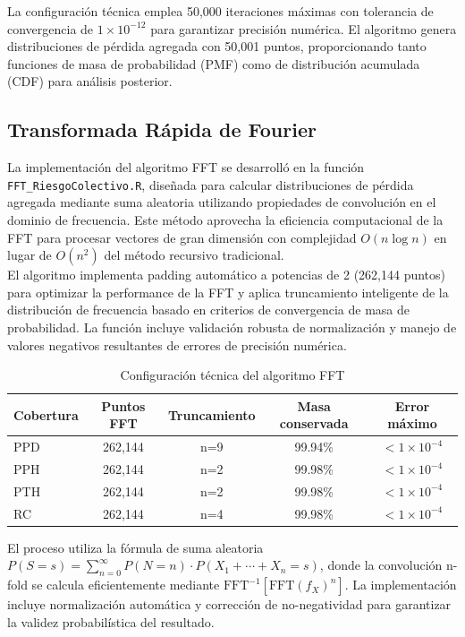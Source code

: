 La configuración técnica emplea 50,000 iteraciones máximas con tolerancia de convergencia de $1 \times 10^{-12}$ para garantizar precisión numérica. El algoritmo genera distribuciones de pérdida agregada con 50,001 puntos, proporcionando tanto funciones de masa de probabilidad (PMF) como de distribución acumulada (CDF) para análisis posterior.

\subsection{Transformada Rápida de Fourier}

La implementación del algoritmo FFT se desarrolló en la función \texttt{FFT\_RiesgoColectivo.R}, diseñada para calcular distribuciones de pérdida agregada mediante suma aleatoria utilizando propiedades de convolución en el dominio de frecuencia. Este método aprovecha la eficiencia computacional de la FFT para procesar vectores de gran dimensión con complejidad $O(n \log n)$ en lugar de $O(n^2)$ del método recursivo tradicional.\\

El algoritmo implementa padding automático a potencias de 2 (262,144 puntos) para optimizar la performance de la FFT y aplica truncamiento inteligente de la distribución de frecuencia basado en criterios de convergencia de masa de probabilidad. La función incluye validación robusta de normalización y manejo de valores negativos resultantes de errores de precisión numérica.

\begin{table}[H]
\centering
\caption{Configuración técnica del algoritmo FFT}
\begin{tabular}{lcccc}
\hline
\textbf{Cobertura} & \textbf{Puntos FFT} & \textbf{Truncamiento} & \textbf{Masa conservada} & \textbf{Error máximo} \\
\hline
PPD & 262,144 & n=9 & 99.94\% & $<1 \times 10^{-4}$ \\
PPH & 262,144 & n=2 & 99.98\% & $<1 \times 10^{-4}$ \\
PTH & 262,144 & n=2 & 99.98\% & $<1 \times 10^{-4}$ \\
RC & 262,144 & n=4 & 99.98\% & $<1 \times 10^{-4}$ \\
\hline
\end{tabular}
\end{table}

El proceso utiliza la fórmula de suma aleatoria $P(S = s) = \sum_{n=0}^{\infty} P(N = n) \cdot P(X_1 + \cdots + X_n = s)$, donde la convolución n-fold se calcula eficientemente mediante $\text{FFT}^{-1}[\text{FFT}(f_X)^n]$. La implementación incluye normalización automática y corrección de no-negatividad para garantizar la validez probabilística del resultado.

